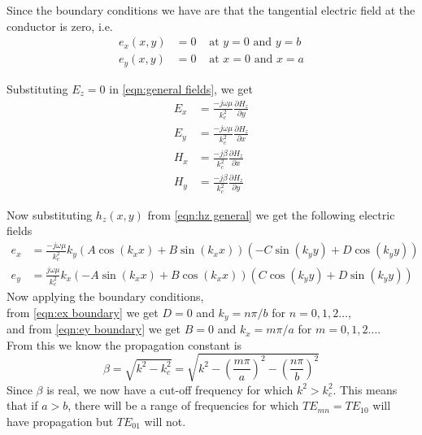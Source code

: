 \begin{enumerate}
Since the boundary conditions we have are that the tangential electric field at the conductor is zero, i.e.
\begin{subequations}
\begin{align}
e_x(x,y)& =0 & \text{ at } y=0 \text{ and } y=b
\label{eqn:ex boundary}\\
e_y(x,y)& =0 & \text{ at } x=0 \text{ and } x=a
\label{eqn:ey boundary}
\end{align}
\end{subequations}

Substituting $E_z=0$ in \ref{eqn:general fields}, we get
\begin{subequations}
\label{eqn:TE transverse diff}
\begin{align}
E_x& =\frac{-j\omega\mu}{k_c^2}\frac{\partial H_z}{\partial y}\\
E_y& =\frac{-j\omega\mu}{k_c^2}\frac{\partial H_z}{\partial x}\\
H_x& =\frac{-j\beta}{k_c^2}\frac{\partial H_z}{\partial x}\\
H_y& =\frac{-j\beta}{k_c^2}\frac{\partial H_z}{\partial y}
\end{align}
\end{subequations}

Now substituting $h_z(x,y)$ from \ref{eqn:hz general} we get the following electric fields
\begin{subequations}
\begin{align}
e_x& =\frac{-j\omega\mu}{k_c^2}k_y(A\cos(k_xx)+B\sin(k_xx))(-C\sin(k_yy)+D\cos(k_yy))\\
e_y& =\frac{j\omega\mu}{k_c^2}k_x(-A\sin(k_xx)+B\cos(k_xx))(C\cos(k_yy)+D\sin(k_yy))
\end{align}
\end{subequations}
Now applying the boundary conditions,\\
from \ref{eqn:ex boundary} we get $D=0$ and $k_y=n\pi/b$ for $n={0,1,2\ldots}$,\\
and from \ref{eqn:ey boundary} we get $B=0$ and $k_x=m\pi/a$ for $m={0,1,2\ldots}$.\\
From this we know the propagation constant is
\begin{equation}
\beta = \sqrt{k^2-k_c^2}=\sqrt{k^2-\left(\frac{m\pi}{a}\right)^2-\left(\frac{n\pi}{b}\right)^2}
\end{equation}
Since $\beta$ is real, we now have a cut-off frequency for which $k^2>k_c^2$. This means that if $a>b$, there will be a range of frequencies for which $TE_{mn}=TE_{10}$ will have propagation but $TE_{01}$ will not.


\end{enumerate}
